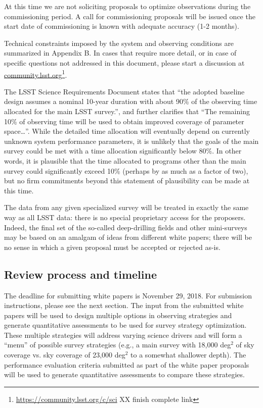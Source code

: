 \documentclass[DM,lsstdraft,toc,usenatbib]{lsstdoc}
\begin{document}
At this time we are not soliciting proposals to optimize observations during the commissioning period.
A call for commissioning proposals will be issued once the start date of commissioning is known with adequate accuracy (1-2 months). 

Technical constraints imposed by the system and observing conditions are summarized in 
Appendix B. In cases that require more detail, or in case of specific questions not addressed in this 
document, please start a discussion at \href{http://community.lsst.org}{community.lsst.org}\footnote{\url{https://community.lsst.org/c/sci} XX finish complete link}.

The LSST Science Requirements Document states that ``the adopted baseline design assumes a 
nominal 10-year duration with about 90\% of the observing time allocated for the main LSST survey.'',
and further clarifies that ``The remaining 10\% of observing time will be used to obtain improved 
coverage of parameter space\dots''. While the detailed time allocation will eventually depend on currently unknown system
performance parameters, it is unlikely that the goals of the main survey could be met with a time allocation
significantly below 80\%. In other words, it is plausible that the time allocated to programs other
than the main survey could significantly exceed 10\% (perhaps by as much as a factor of two), but 
no firm commitments beyond this statement of plausibility can be made at this time. 

The data from any given specialized survey will be treated in exactly the same way as all LSST 
data: there is no special proprietary access for the proposers. Indeed, the final set of the so-called
deep-drilling fields and other mini-surveys may be based on an amalgam of ideas from different 
white papers; there will be no sense in which a given proposal must be accepted or rejected as-is.  


\subsection{Review process and timeline}

The deadline for submitting white papers is November 29, 2018. For submission instructions, 
please see the next section. The input from the submitted white papers will be used to design multiple
options in observing strategies and generate quantitative assessments to be used for survey strategy optimization.
These multiple strategies will address varying science drivers and will form a ``menu'' of possible survey strategies (e.g., a main 
survey with 18,000 deg$^2$ of sky coverage vs. sky coverage of 23,000 deg$^2$ to a
somewhat shallower depth). The performance evaluation criteria submitted as part of the white paper proposals
will be used to generate quantitative assessments to compare these strategies. 
\end{document}
